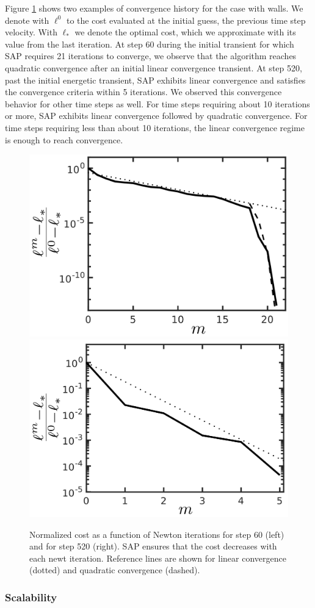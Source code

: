Figure \ref{fig:clutter_line_search} shows two examples of convergence history
for the case with walls. We denote with $\ell^0$ to the cost evaluated at the
initial guess, the previous time step velocity. With $\ell_*$ we denote the
optimal cost, which we approximate with its value from the last iteration. At
step 60 during the initial transient for which SAP requires 21 iterations to
converge, we observe that the algorithm reaches quadratic convergence after an
initial linear convergence transient. At step 520, past the initial energetic
transient, SAP exhibits linear convergence and satisfies the convergence
criteria within 5 iterations. We observed this convergence behavior for other
time steps as well. For time steps requiring about 10 iterations or more, SAP
exhibits linear convergence followed by quadratic convergence. For time steps
requiring less than about 10 iterations, the linear convergence regime is enough
to reach convergence.
\begin{figure}[!h]
	\centering
    \includegraphics[height=0.34\columnwidth]{figures/clutter/normalized_cost_step60_21its_wwalls_latex_labels.png}
	\includegraphics[height=0.34\columnwidth]{figures/clutter/normalized_cost_step520_5its_wwalls_latex_labels.png}    
	\caption{\label{fig:clutter_line_search} 
	Normalized cost as a function of Newton iterations for step 60 (left) and for step 520 (right). SAP ensures that the cost decreases with each newt iteration. Reference lines are shown for linear convergence (dotted) and quadratic convergence (dashed).}
\end{figure}

\subsubsection{Scalability}

